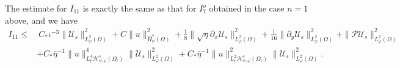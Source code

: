 \documentclass{amsart}
\numberwithin{equation}{section}
\begin{document}
 The estimate for $I_{11}$ is exactly the same as that for $I_{7}^{o}$ obtained in the case $n=1$ above, and we have
\begin{align*}
I_{11}
\leq&~C_{*}\iota^{-3}\|\mathcal{U}_{s}\|_{L_{\varphi}^{2}(\Omega)}^{2}
     +C\|u\|_{\hat{H}_{\psi}^{s}(\Omega)}^{2}
     +\frac{1}{8}\|\sqrt{\eta}\partial_{x}\mathcal{U}_{s}\|_{L_{\varphi}^{2}(\Omega)}^{2}
     +\frac{1}{16}\|\partial_{y}\mathcal{U}_{s}\|_{L_{\varphi}^{2}(\Omega)}^{2}
     +\|\mathcal{P}\mathcal{U}_{s}\|_{L_{\varphi}^{2}(\Omega)}^{2}\\
    &+C_{*}\bar{\eta}^{-1}\|u\|_{L_{t}^{4}\mathcal{H}_{\psi,\varphi}^{s}(\Omega_{t})}^{4}\|\mathcal{U}_{s}\|_{L_{\varphi}^{2}(\Omega)}^{2}
     +C_{*}\bar{\eta}^{-1}\|u\|_{L_{t}^{2}\mathcal{H}_{\psi,\varphi}^{s}(\Omega_{t})}^{2}\|\mathcal{U}_{s}\|_{L_{\varphi}^{2}(\Omega)}^{2}.
\end{align*}
\end{document}
